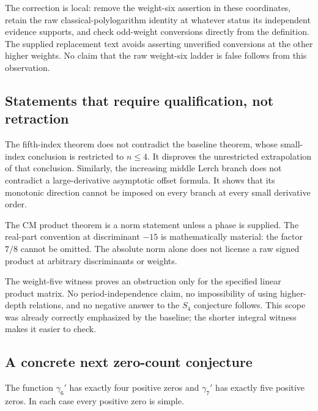 The correction is local: remove the weight-six assertion in these
coordinates, retain the raw classical-polylogarithm identity at whatever
status its independent evidence supports, and check odd-weight conversions
directly from the definition. The supplied replacement text avoids
asserting unverified conversions at the other higher weights. No claim
that the raw weight-six ladder is false follows from this observation.

\subsection{Statements that require qualification, not retraction}

The fifth-index theorem does not contradict the baseline theorem, whose
small-index conclusion is restricted to $n\le4$. It disproves the
unrestricted extrapolation of that conclusion. Similarly, the increasing
middle Lerch branch does not contradict a large-derivative asymptotic
offset formula. It shows that its monotonic direction cannot be imposed
on every branch at every small derivative order.

The CM product theorem is a norm statement unless a phase is supplied.
The real-part convention at discriminant $-15$ is mathematically material:
the factor $7/8$ cannot be omitted. The absolute norm alone does not
license a raw signed product at arbitrary discriminants or weights.

The weight-five witness proves an obstruction only for the specified
linear product matrix. No period-independence claim, no impossibility of
using higher-depth relations, and no negative answer to the $S_4$
conjecture follows. This scope was already correctly emphasized by the
baseline; the shorter integral witness makes it easier to check.

\subsection{A concrete next zero-count conjecture}

\begin{conjecture}
\label{conj:n6n7}
The function $\gamma_6'$ has exactly four positive zeros and
$\gamma_7'$ has exactly five positive zeros. In each case every positive
zero is simple.
\end{conjecture}

